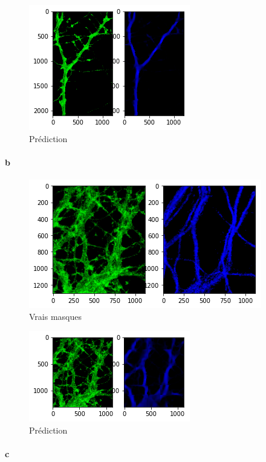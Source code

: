 \documentclass{report}
\begin{document}
 \begin{figure}[H]
 \centering
 \includegraphics[scale=0.55]{"2_result"}
 \caption{Prédiction}
 \end{figure}

 \paragraph{b}

 \begin{figure}[H]
 \centering
 \includegraphics[scale=0.35]{"91_truth"}
 \caption{Vrais masques}
 \end{figure}

 \begin{figure}[H]
 \centering
 \includegraphics[scale=0.65]{"91_result"}
 \caption{Prédiction}
 \end{figure}

 \paragraph{c}
\end{document}
